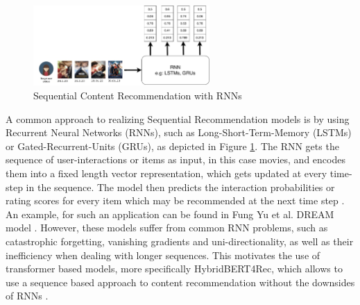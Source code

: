 \documentclass{Academic}
\begin{document}
    \begin{figure}[ht!]
        \centering
        \includegraphics[width=0.6\textwidth]{images/rnn_seq.pdf}
        \caption{Sequential Content Recommendation with RNNs \cite{yuDynamicRecurrentModel2016}}
        \label{fig:seqRNN}
    \end{figure}
    A common approach to realizing Sequential Recommendation models is by using Recurrent Neural Networks (RNNs), such as Long-Short-Term-Memory (LSTMs) or Gated-Recurrent-Units (GRUs), as depicted in Figure \ref{fig:seqRNN}. The RNN gets the sequence of user-interactions or items as input, in this case movies, and encodes them into a fixed length vector representation, which gets updated at every time-step in the sequence. The model then predicts the interaction probabilities or rating scores for every item which may be recommended at the next time step \cite{yuDynamicRecurrentModel2016}. An example, for such an application can be found in Fung Yu et al. DREAM model \cite{yuDynamicRecurrentModel2016}. However, these models suffer from common RNN problems, such as catastrophic forgetting, vanishing gradients and uni-directionality, as well as their inefficiency when dealing with longer sequences. This motivates the use of transformer based models, more specifically HybridBERT4Rec, which allows to use a sequence based approach to content recommendation without the downsides of RNNs \cite{channarongHybridBERT4RecHybridContentBased2022}.

    \FloatBarrier
\end{document}
